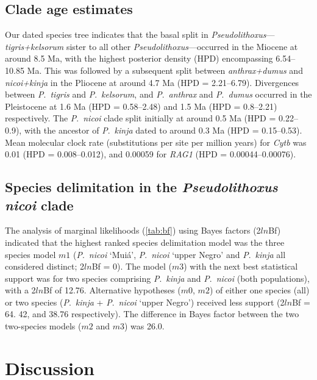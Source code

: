\documentclass[12pt]{article}
\begin{document}
\subsection*{Clade age estimates}

Our dated species tree indicates that the basal split in \emph{Pseudolithoxus}---\emph{tigris+kelsorum} sister to all other \emph{Pseudolithoxus}---occurred in the Miocene at around 8.5 Ma, with the highest posterior density (HPD) encompassing 6.54--10.85 Ma. %
This was followed by a subsequent split between \emph{anthrax+dumus} and \emph{nicoi+kinja} in the Pliocene at around 4.7 Ma (HPD = 2.21--6.79). %
Divergences between \emph{P}.\ \emph{tigris} and \emph{P}.\ \emph{kelsorum}, and \emph{P}.\ \emph{anthrax} and \emph{P}.\ \emph{dumus} occurred in the Pleistocene at 1.6 Ma (HPD = 0.58--2.48) and 1.5 Ma (HPD = 0.8--2.21) respectively. %
The \emph{P}.\ \emph{nicoi} clade split initially at around 0.5 Ma (HPD = 0.22–0.9), with the ancestor of \emph{P}.\ \emph{kinja} dated to around 0.3 Ma (HPD = 0.15–0.53). %
Mean molecular clock rate (substitutions per site per million years) for \emph{Cytb} was 0.01 (HPD = 0.008--0.012), and 0.00059 for \emph{RAG1} (HPD = 0.00044--0.00076).

\subsection*{Species delimitation in the \emph{Pseudolithoxus nicoi} clade}

The analysis of marginal likelihoods (\autoref{tab:bf}) using Bayes factors (2$ln$Bf) indicated that the highest ranked species delimitation model was the three species model $m1$ (\emph{P}.\ \emph{nicoi} `Muiá', \emph{P}.\ \emph{nicoi} `upper Negro' and \emph{P}.\ \emph{kinja} all considered distinct; 2$ln$Bf = 0). %
The model ($m3$) with the next best statistical support was for two species comprising \emph{P}.\ \emph{kinja} and \emph{P}.\ \emph{nicoi} (both populations), with a 2$ln$Bf of 12.76. %
Alternative hypotheses ($m0$, $m2$) of either one species (all) or two species (\emph{P}.\ \emph{kinja} + \emph{P}.\ \emph{nicoi} `upper Negro') received less support (2$ln$Bf = 64. 42, and 38.76 respectively). %
The difference in Bayes factor between the two two-species models ($m2$ and $m3$) was 26.0.%

\section*{Discussion}
\end{document}
